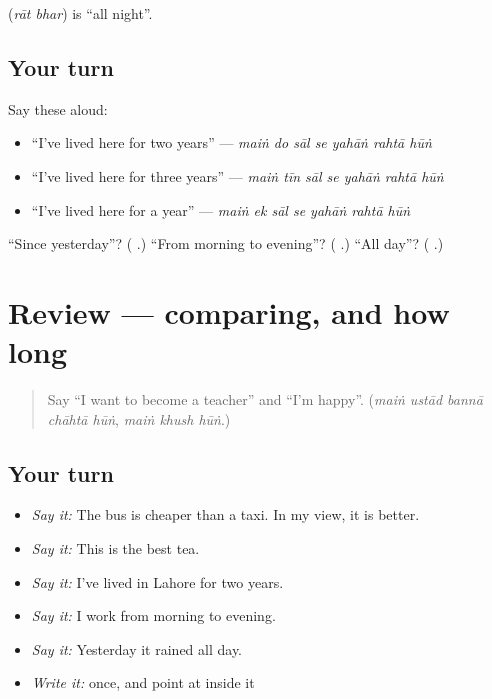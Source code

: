 \textbf{ } (\emph{rāt bhar}) is \textquotedblleft{}all night\textquotedblright{}.

\subsection*{Your turn}
Say these aloud:

\begin{itemize}
\raggedright
  \item \textquotedblleft{}I've lived here for two years\textquotedblright{} — \emph{maiṅ do sāl se yahāṅ rahtā hūṅ}
  \item \textquotedblleft{}I've lived here for three years\textquotedblright{} — \emph{maiṅ tīn sāl se yahāṅ rahtā hūṅ}
  \item \textquotedblleft{}I've lived here for a year\textquotedblright{} — \emph{maiṅ ek sāl se yahāṅ rahtā hūṅ}
\end{itemize}

\begin{tcolorbox}[breakable,colback=teal!4,colframe=teal!35!black,title={Before you move on}]
\textquotedblleft{}Since yesterday\textquotedblright{}? (\textbf{ }.) \textquotedblleft{}From morning to evening\textquotedblright{}? (\textbf{   }.) \textquotedblleft{}All day\textquotedblright{}? (\textbf{ }.)
\end{tcolorbox}
\section[(review)]{Review — comparing, and how long}

\label{lesson:UR-R273-comparing-and-time}



\begin{quote}
Say \textquotedblleft{}I want to become a teacher\textquotedblright{} and \textquotedblleft{}I'm happy\textquotedblright{}. (\emph{maiṅ ustād bannā chāhtā hūṅ}, \emph{maiṅ khush hūṅ}.)
\end{quote}

\subsection*{Your turn}
\begin{itemize}
\raggedright
  \item \emph{Say it:} The bus is cheaper than a taxi. In my view, it is better.
  \item \emph{Say it:} This is the best tea.
  \item \emph{Say it:} I've lived in Lahore for two years.
  \item \emph{Say it:} I work from morning to evening.
  \item \emph{Say it:} Yesterday it rained all day.
  \item \emph{Write it:} \textbf{} once, and point at  inside it
\end{itemize}

